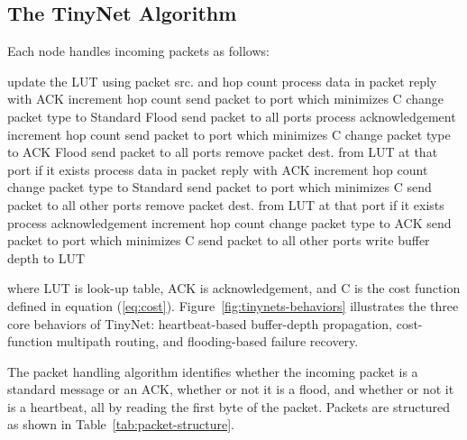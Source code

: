 \subsection{The TinyNet Algorithm}
Each node handles incoming packets as follows:
\begin{algorithmic}
	\footnotesize
		\State update the LUT using packet src. and hop count
	\EndIf
			\State process data in packet
			\State reply with ACK
		\Else
			\State increment hop count
				\State send packet to port which minimizes C
			\Else
				\State change packet type to Standard Flood
				\State send packet to all ports
			\EndIf
		\EndIf
			\State process acknowledgement
		\Else
			\State increment hop count
				\State send packet to port which minimizes C
			\Else
				\State change packet type to ACK Flood
				\State send packet to all ports
			\EndIf
		\EndIf
		\State remove packet dest. from LUT at that port if it exists
				\State process data in packet
				\State reply with ACK
			\Else
				\State increment hop count
					\State change packet type to Standard
					\State send packet to port which minimizes C
				\Else
					\State send packet to all other ports
				\EndIf
			\EndIf
		\EndIf
		\State remove packet dest. from LUT at that port if it exists
				\State process acknowledgement
			\Else
				\State increment hop count
					\State change packet type to ACK
					\State send packet to port which minimizes C
				\Else
					\State send packet to all other ports
				\EndIf
			\EndIf
		\EndIf
	\Else
		\State write buffer depth to LUT
	\EndIf
\end{algorithmic}
where LUT is look-up table, ACK is acknowledgement, and C is the cost function defined in equation (\ref{eq:cost}). Figure~\ref{fig:tinynets-behaviors} illustrates the three core behaviors of TinyNet: heartbeat-based buffer-depth propagation, cost-function multipath routing, and flooding-based failure recovery.

The packet handling algorithm identifies whether the incoming packet is a standard message or an ACK, whether or not it is a flood, and whether or not it is a heartbeat, all by reading the first byte of the packet. Packets are structured as shown in Table~\ref{tab:packet-structure}.

